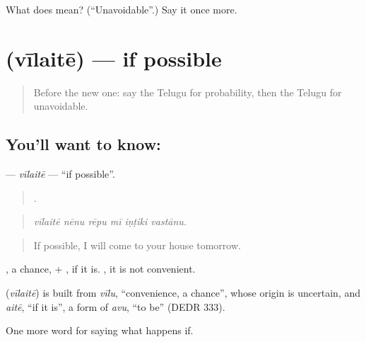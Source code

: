 \begin{tcolorbox}[breakable,colback=teal!4,colframe=teal!35!black,title={Before you move on}]
What does  mean? (\textquotedblleft{}Unavoidable\textquotedblright{}.) Say it once more.
\end{tcolorbox}
\section[\texorpdfstring{\te{వీలైతే} (vīlaitē)}{వీలైతే (vīlaitē)}]{ (vīlaitē) — if possible}

\label{lesson:TE-C418-vilaite}



\begin{quote}
Before the new one: say the Telugu for probability, then the Telugu for unavoidable.
\end{quote}

\subsection*{You'll want to know: }
\textbf{} — \emph{vīlaitē} — \textquotedblleft{}if possible\textquotedblright{}.

\begin{quote}
     .
\end{quote}

\begin{quote}
\emph{vīlaitē nēnu rēpu mī iṇṭiki vastānu.}
\end{quote}

\begin{quote}
If possible, I will come to your house tomorrow.
\end{quote}

, a chance, + , if it is.  , it is not convenient.

\begin{cousinweb}
\textbf{} (\emph{vīlaitē}) is built from \emph{vīlu}, \textquotedblleft{}convenience, a chance\textquotedblright{}, whose origin is uncertain, and \emph{aitē}, \textquotedblleft{}if it is\textquotedblright{}, a form of \emph{avu}, \textquotedblleft{}to be\textquotedblright{} (DEDR 333).
\end{cousinweb}

\begin{grammarlens}[title={What you've built}]
One more word for saying what happens if.
\end{grammarlens}

